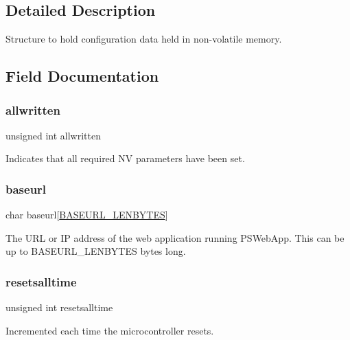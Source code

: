 \subsection{Detailed Description}
Structure to hold configuration data held in non-\/volatile memory. 

\subsection{Field Documentation}
\mbox{\label{structnvstruct_a3fee61ddd1d863385c81b1d53599191a}} 
\subsubsection{\texorpdfstring{allwritten}{allwritten}}
{\footnotesize\ttfamily unsigned int allwritten}

Indicates that all required NV parameters have been set. \mbox{\label{structnvstruct_a727d0685583daae50e80c9eea7b16c15}} 
\subsubsection{\texorpdfstring{baseurl}{baseurl}}
{\footnotesize\ttfamily char baseurl\mbox{[}\mbox{\hyperlink{nvtype_8h_a2d582ce7be27d531cfcc211e0bf24c0f}{B\+A\+S\+E\+U\+R\+L\+\_\+\+L\+E\+N\+B\+Y\+T\+ES}}\mbox{]}}

The U\+RL or IP address of the web application running P\+S\+Web\+App. This can be up to B\+A\+S\+E\+U\+R\+L\+\_\+\+L\+E\+N\+B\+Y\+T\+ES bytes long. \mbox{\label{structnvstruct_a045498ec4eca300d51f030a958ed5ee1}} 
\subsubsection{\texorpdfstring{resetsalltime}{resetsalltime}}
{\footnotesize\ttfamily unsigned int resetsalltime}

Incremented each time the microcontroller resets. \mbox{\label{structnvstruct_a48f727b15838a972aff7c7d7397ff641}} 
